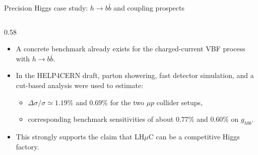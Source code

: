 \documentclass[aspectratio=1610,english]{beamer}
\newcommand{\LHCmu}{LH$\mu$C}
\begin{document}
\begin{frame}{Precision Higgs case study: $h\to b\bar b$ and coupling prospects}
\begin{columns}[T]
		
\begin{column}{0.58\textwidth}
\begin{itemize}
\justifying
\item A concrete benchmark already exists for the charged-current VBF process with $h\to b\bar b$.
				
\item In the HELP4CERN draft, parton showering, fast detector simulation, and a cut-based analysis were used to estimate:
\begin{itemize}
\justifying
\item $\Delta \sigma/\sigma \simeq 1.19\%$ and $0.69\%$ for the two $\mu p$ collider setups,
\item corresponding benchmark sensitivities of about $0.77\%$ and $0.60\%$ on $g_{hbb}$.
\end{itemize}
\justifying
\item This strongly supports the claim that \LHCmu{} can be a competitive Higgs factory.		
\end{itemize}
\end{column}
		

\end{columns}
\end{frame}
\end{document}
